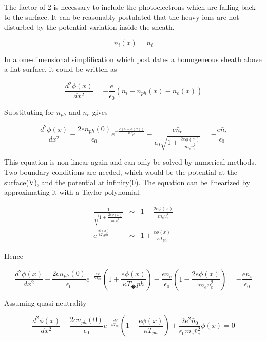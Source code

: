 \documentclass[a4paper,11pt]{thesis}
\begin{document}
The factor of 2 is necessary to include the photoelectrons which are falling back to the surface. It can be reasonably postulated that the heavy ions are not disturbed by the potential variation inside the sheath.

\begin{equation}
    n_i(x)=\bar{n}_i
\end{equation}

In a one-dimensional simplification which postulates a homogeneous sheath above a flat surface, it could be written as

\begin{equation}\label{eq:poisson}
    \frac{d^2 \phi(x)}{dx^2}=-\frac{e}{\epsilon_0}\left( \bar{n}_i -n_{ph}(x)-n_{e}(x) \right)
\end{equation}

Substituting for $n_{ph}$ and $n_e$ gives

\begin{equation}
    \frac{d^2 \phi(x)}{dx^2}-\frac{2en_{ph}(0)}{\epsilon_0} e^{-\frac{e(V-\phi(x))}{\kappa T_{ph}}}-\frac{e\bar{n}_e}{\epsilon_0\sqrt{1+\frac{2e\phi(x)}{m_e\bar{v}_e^2}}} =-\frac{e\bar{n}_i }{\epsilon_0}
\end{equation}

This equation is non-linear again and can only be solved by numerical methods. Two boundary conditions are needed, which would be the potential at the surface(V), and the potential at infinity(0). The equation can be linearized by approximating it with a Taylor polynomial.

\begin{eqnarray}
  \frac{1}{\sqrt{1+\frac{2e\phi(x)}{m_e\bar{v}_e^2}}} &\sim& 1-\frac{2e\phi(x)}{m_e\bar{v}_e^2} \\
e^{\frac{e\phi(x)}{kT_e{ph}}} &\sim& 1+\frac{e\phi(x)}{\kappa T_{ph}}
\end{eqnarray}

Hence

\begin{equation}
    \frac{d^2 \phi(x)}{dx^2}-\frac{2en_{ph}(0)}{\epsilon_0} e^{-\frac{eV}{\kappa T_{ph}}}\left( 1+\frac{e\phi(x)}{\kappa T_�{ph}} \right)-\frac{e\bar{n}_e}{\epsilon_0}\left( 1-\frac{2e\phi(x)}{m_e\bar{v}_e^2}\right) =-\frac{e\bar{n}_i }{\epsilon_0}
\end{equation}

Assuming quasi-neutrality

\begin{equation}
    \frac{d^2 \phi(x)}{dx^2}-\frac{2en_{ph}(0)}{\epsilon_0} e^{-\frac{eV}{\kappa T_{ph}}}\left( 1+\frac{e\phi(x)}{\kappa T_{ph}} \right)+\frac{2e^2\bar{n}_0}{\epsilon_0 m_e\bar{v}_e^2} \phi(x)=0
\end{equation}
\end{document}
